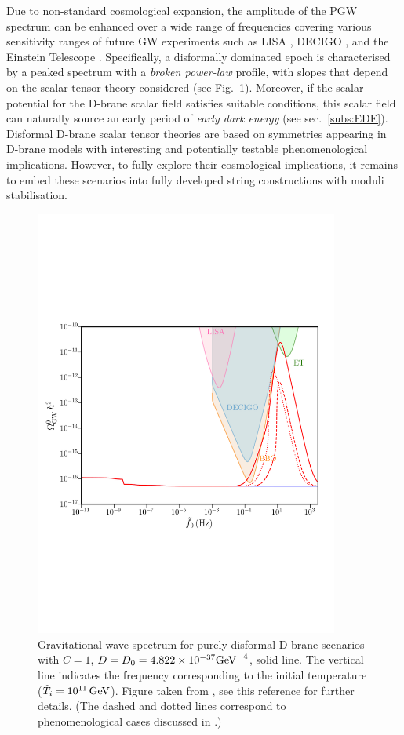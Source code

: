 Due to non-standard cosmological expansion, the amplitude of the PGW spectrum can be enhanced over a wide range of frequencies covering various sensitivity ranges of future GW experiments such as LISA \cite{amaroseoane2017laser}, DECIGO \cite{Seto:2001qf}, and the Einstein Telescope \cite{Maggiore:2019uih}. Specifically, a disformally dominated epoch is characterised by a peaked spectrum with a {\em broken power-law} profile, with slopes that depend on the scalar-tensor theory considered \cite{Chowdhury:2022gdc} (see Fig.~\ref{Fig:DisformalGW}).  Moreover, if the scalar potential for the D-brane scalar field  satisfies suitable conditions, this scalar field can naturally source an early period of {\em early dark energy} \cite{Chowdhury:2023} (see sec.~\ref{subs:EDE}). Disformal D-brane scalar tensor theories are based on symmetries appearing in D-brane models with  interesting and potentially testable phenomenological implications. However, to fully explore their cosmological implications, it remains to embed  these scenarios into fully developed string constructions with moduli stabilisation. 

\begin{figure}[H]
\begin{center}
\includegraphics[width=10.00cm]{Sections/Figures/Disformal_GW.pdf}
\end{center}
\vskip -95pt
\caption{Gravitational wave spectrum for purely disformal D-brane scenarios with $C=1$, $D=D_0=4.822\times 10^{-37}{\rm GeV}^{-4}$, solid line. The vertical line indicates the frequency corresponding to the initial temperature ($\tilde T_i=10^{11}\,{\rm GeV}$). Figure taken from \cite{Chowdhury:2022gdc}, see this reference for further details.  (The dashed and dotted lines correspond to phenomenological cases discussed in \cite{Chowdhury:2022gdc}.)
}\label{Fig:DisformalGW}
\end{figure}




